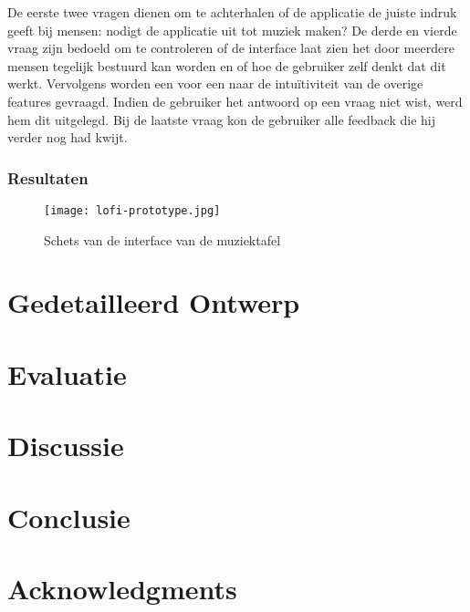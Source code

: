 \documentclass{acm}
\begin{document}
De eerste twee vragen dienen om te achterhalen of de applicatie de juiste indruk geeft bij mensen: nodigt de applicatie uit tot muziek maken? De derde en vierde vraag zijn bedoeld om te controleren of de interface laat zien het door meerdere mensen tegelijk bestuurd kan worden en of hoe de gebruiker zelf denkt dat dit werkt. Vervolgens worden een voor een naar de intuïtiviteit van de overige features gevraagd. Indien de gebruiker het antwoord op een vraag niet wist, werd hem dit uitgelegd. Bij de laatste vraag kon de gebruiker alle feedback die hij verder nog had kwijt.

\subsubsection{Resultaten}



\begin{figure}
  \texttt{[image: lofi-prototype.jpg]}
  \caption{Schets van de interface van de muziektafel}
  \label{fig_muziektafel}
\end{figure}


\section{Gedetailleerd Ontwerp}
\label{sec_detail}


\section{Evaluatie}
\label{sec_evaluatie}

\section{Discussie}
\label{sec_discussie}

\section{Conclusie}
\label{sec_conclusie}

\section{Acknowledgments}
\end{document}
